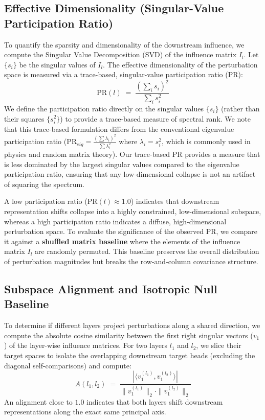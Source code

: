 \documentclass[11pt,a4paper]{article}
\newcommand{\pr}{\text{PR}}
\theoremstyle{definition}
\theoremstyle{plain}
\begin{document}
\subsection{Effective Dimensionality (Singular-Value Participation Ratio)}
To quantify the sparsity and dimensionality of the downstream influence, we compute the Singular Value Decomposition (SVD) of the influence matrix $I_l$. Let $\{s_i\}$ be the singular values of $I_l$. The effective dimensionality of the perturbation space is measured via a trace-based, singular-value participation ratio ($\pr$):
\begin{equation}
    \pr(l) \;=\; \frac{\left( \sum_{i} s_i \right)^2}{\sum_{i} s_i^2}
    \label{eq:pr}
\end{equation}
We define the participation ratio directly on the singular values $\{s_i\}$ (rather than their squares $\{s_i^2\}$) to provide a trace-based measure of spectral rank. We note that this trace-based formulation differs from the conventional eigenvalue participation ratio ($\pr_{eig} = \frac{(\sum \lambda_i)^2}{\sum \lambda_i^2}$ where $\lambda_i = s_i^2$, which is commonly used in physics and random matrix theory). Our trace-based $\pr$ provides a measure that is less dominated by the largest singular values compared to the eigenvalue participation ratio, ensuring that any low-dimensional collapse is not an artifact of squaring the spectrum. 

A low participation ratio ($\pr(l) \approx 1.0$) indicates that downstream representation shifts collapse into a highly constrained, low-dimensional subspace, whereas a high participation ratio indicates a diffuse, high-dimensional perturbation space. To evaluate the significance of the observed $\pr$, we compare it against a \textbf{shuffled matrix baseline} where the elements of the influence matrix $I_l$ are randomly permuted. This baseline preserves the overall distribution of perturbation magnitudes but breaks the row-and-column covariance structure.

\subsection{Subspace Alignment and Isotropic Null Baseline}
To determine if different layers project perturbations along a shared direction, we compute the absolute cosine similarity between the first right singular vectors ($v_1$) of the layer-wise influence matrices. For two layers $l_1$ and $l_2$, we slice their target spaces to isolate the overlapping downstream target heads (excluding the diagonal self-comparisons) and compute:
\begin{equation}
    A(l_1, l_2) \;=\; \frac{|\langle v_1^{(l_1)}, v_1^{(l_2)} \rangle|}{\|v_1^{(l_1)}\|_2 \cdot \|v_1^{(l_2)}\|_2}
    \label{eq:alignment}
\end{equation}
An alignment close to $1.0$ indicates that both layers shift downstream representations along the exact same principal axis. 
\end{document}
